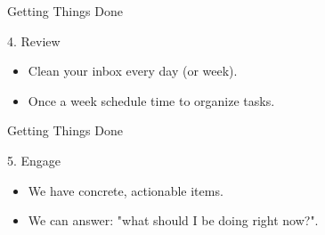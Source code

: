 \begin{frame}{Getting Things Done}
  \begin{block}{4. Review}
    \begin{itemize}
      \item Clean your inbox every day (or week). 
      \item Once a week schedule time to organize tasks.
    \end{itemize}
  \end{block}
\end{frame}

\begin{frame}{Getting Things Done}
  \begin{block}{5. Engage}
    \begin{itemize}
      \item We have concrete, actionable items.
      \item We can answer: "what should I be doing right now?".
    \end{itemize}
  \end{block}
\end{frame}

